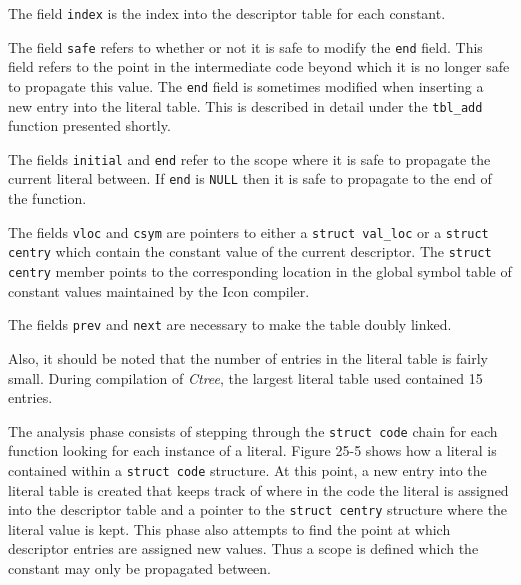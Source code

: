 The field \texttt{index} is the index into the descriptor table for
each constant.


The field \texttt{safe} refers to whether or not it is safe to modify
the \texttt{end} field. This field refers to the point in the
intermediate code beyond which it is no longer safe to propagate this
value. The \texttt{end} field is sometimes modified when inserting a
new entry into the literal table. This is described in detail under
the \texttt{tbl\_add} function presented shortly.


The fields \texttt{initial} and \texttt{end} refer to the scope where
it is safe to propagate the current literal between. If \texttt{end}
is \texttt{NULL} then it is safe to propagate to the end of the
function.


The fields \texttt{vloc} and \texttt{csym} are pointers to either a
\texttt{struct val\_loc} or a \texttt{struct centry} which contain the
constant value of the current descriptor. The \texttt{struct centry}
member points to the corresponding location in the global symbol table
of constant values maintained by the Icon compiler.

The fields \texttt{prev} and \texttt{next} are necessary to make the
table doubly linked.

Also, it should be noted that the number of entries in the literal
table is fairly small. During compilation of \textit{Ctree}, the
largest literal table used contained 15 entries.

The analysis phase consists of stepping through the \texttt{struct
code} chain for each function looking for each instance of a
literal. Figure 25-5 shows how a literal is contained within a
\texttt{struct code} structure. At this point, a new entry into the
literal table is created that keeps track of where in the code the
literal is assigned into the descriptor table and a pointer to the
\texttt{struct centry} structure where the literal value is kept.
This phase also attempts to find the point at which descriptor entries
are assigned new values. Thus a scope is defined which the constant
may only be propagated between.


\bigskip

